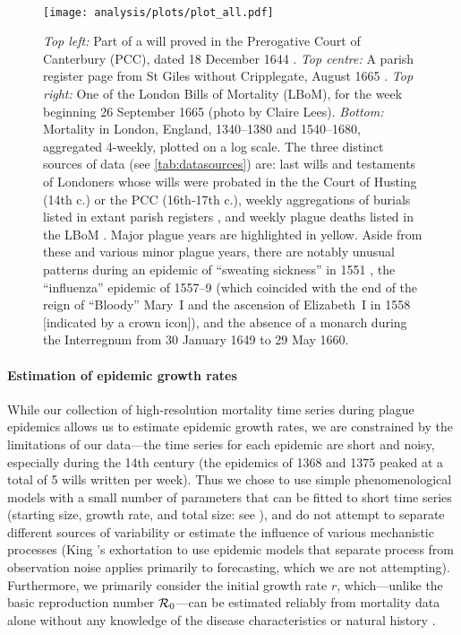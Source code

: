 \begin{figure}
\begin{center}
{%
}
\\ \vspace{0.5cm}
\texttt{[image: analysis/plots/plot\_all.pdf]}
\end{center}
\vspace{-0.5cm}
\caption[]{
  \emph{Top left:} Part of a will proved in the Prerogative Court of Canterbury (PCC), dated 18 December 1644 \cite{Archives2018}.
  \emph{Top centre:} A parish register page from St Giles without Cripplegate, August 1665 \cite[courtesy of the Wellcome Collection: \url{https://wellcomecollection.org/works/uutd7scc}]{Bell24}.
  \emph{Top right:} One of the London Bills of Mortality (LBoM), for the week beginning 26 September 1665 (photo by Claire Lees).
\emph{Bottom:}
Mortality in London, England, 1340--1380 and 1540--1680, aggregated 4-weekly, plotted on a log scale.  The three distinct sources of data (see \cref{tab:datasources}) are: 
last wills and testaments of Londoners whose wills were probated in the the Court of Husting (14th c.{}) or the PCC (16th-17th c.{}),
weekly aggregations of burials listed in extant parish registers \cite{Slac90}, 
and weekly plague deaths listed in the LBoM \cite{Crei65}.
Major plague years are highlighted in yellow.  Aside from these and various minor plague years, there are notably unusual patterns during an epidemic of ``sweating sickness'' in 1551 \cite[p.\,70]{Slac90}, the ``influenza'' epidemic of 1557--9 \cite[p.\,70]{Slac90} (which coincided with the end of the reign of ``Bloody'' Mary~I and the ascension of Elizabeth~I in 1558 [indicated by a crown icon]), and the absence of a monarch during the Interregnum from 30 January 1649 to 29 May 1660.
}
\label{F:plot3sources}
\end{figure}
%


\paragraph{Estimation of epidemic growth rates}

While our collection of high-resolution mortality time series during plague epidemics allows us to estimate epidemic growth rates, we are constrained by the limitations of our data---the time series for each epidemic are short and noisy, especially during the 14th century (\eg the epidemics of 1368 and 1375 peaked at a total of 5 wills written per week). Thus we chose to use simple phenomenological models with a small number of parameters that can be fitted to short time series (starting size, growth rate, and total size: see \Methodslink), and do not attempt to separate different sources of variability or estimate the influence of various mechanistic processes (King \etal's exhortation to use epidemic models that separate process from observation noise \cite{King+2015} applies primarily to forecasting, which we are not attempting).
Furthermore, we primarily consider the initial growth rate $r$, which---unlike the basic reproduction number ${\mathcal R}_0$---can be estimated reliably from mortality data alone without any knowledge of the disease characteristics or natural history \cite{Ma+14}.

